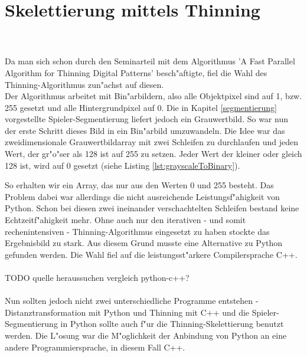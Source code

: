 \section{Skelettierung mittels Thinning} 
\label{implThinning}
 \\ \\
Da man sich schon durch den Seminarteil mit dem Algorithmus 'A Fast Parallel Algorithm for Thinning Digital Patterns' besch"aftigte, fiel die Wahl des Thinning-Algorithmus zun"achst auf diesen. \\
Der Algorithmus arbeitet mit Bin"arbildern, also alle Objektpixel sind auf 1, bzw. 255 gesetzt und alle Hintergrundpixel auf 0. Die in Kapitel \ref{segmentierung} vorgestellte Spieler-Segmentierung liefert jedoch ein Grauwertbild. So war nun der erste Schritt dieses Bild in ein Bin"arbild umzuwandeln. Die Idee war das zweidimensionale Grauwertbildarray mit zwei Schleifen zu durchlaufen und jeden Wert, der gr"o"ser als 128 ist auf 255 zu setzen. Jeder Wert der kleiner oder gleich 128 ist, wird auf 0 gesetzt (siehe Listing \ref{lst:grayscaleToBinary}). 

So erhalten wir ein Array, das nur aus den Werten 0 und 255 besteht. Das Problem dabei war allerdings die nicht ausreichende Leistungsf"ahigkeit von Python. Schon bei diesen zwei ineinander verschachtelten Schleifen bestand keine Echtzeitf"ahigkeit mehr. Ohne auch nur den iterativen - und somit rechenintensiven - Thinning-Algorithmus eingesetzt zu haben stockte das Ergebnisbild zu stark. Aus diesem Grund musste eine Alternative zu Python gefunden werden. Die Wahl fiel auf die leistungsst"arkere Compilersprache C++. \\ \\
TODO quelle heraussuchen vergleich python-c++?
\\ \\
Nun sollten jedoch nicht zwei unterschiedliche Programme entstehen - Distanztransformation mit Python und Thinning mit C++ und die Spieler-Segmentierung in Python sollte auch f"ur die Thinning-Skelettierung benutzt werden. Die L"osung war die M"oglichkeit der Anbindung von Python an eine andere Programmiersprache, in diesem Fall C++.

